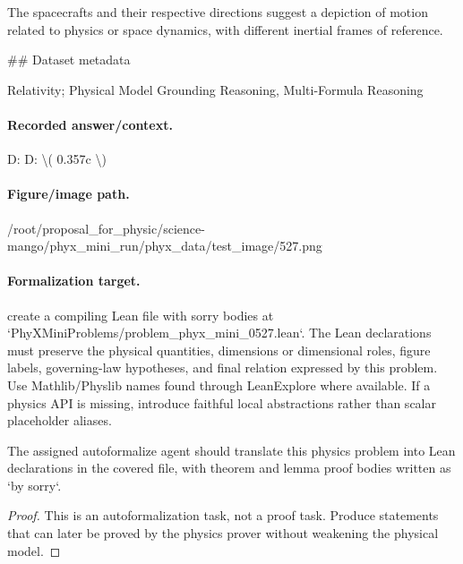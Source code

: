 The spacecrafts and their respective directions suggest a depiction of motion related to physics or space dynamics, with different inertial frames of reference.

\#\# Dataset metadata

Relativity; Physical Model Grounding Reasoning, Multi-Formula Reasoning

\paragraph{Recorded answer/context.}
D: D: \textbackslash{}( 0.357c \textbackslash{})

\paragraph{Figure/image path.}
/root/proposal\_for\_physic/science-mango/phyx\_mini\_run/phyx\_data/test\_image/527.png

\paragraph{Formalization target.}
create a compiling Lean file with sorry bodies at `PhyXMiniProblems/problem\_phyx\_mini\_0527.lean`. The Lean declarations must preserve the physical quantities, dimensions or dimensional roles, figure labels, governing-law hypotheses, and final relation expressed by this problem.
Use Mathlib/Physlib names found through LeanExplore where available. If a physics API is missing, introduce faithful local abstractions rather than scalar placeholder aliases.

\begin{theorem}
\label{thm:physics:phyx_mini_0527:target}
The assigned autoformalize agent should translate this physics problem into Lean declarations in the covered file, with theorem and lemma proof bodies written as `by sorry`.
\end{theorem}
\begin{proof}
This is an autoformalization task, not a proof task. Produce statements that can later be proved by the physics prover without weakening the physical model.
\end{proof}

